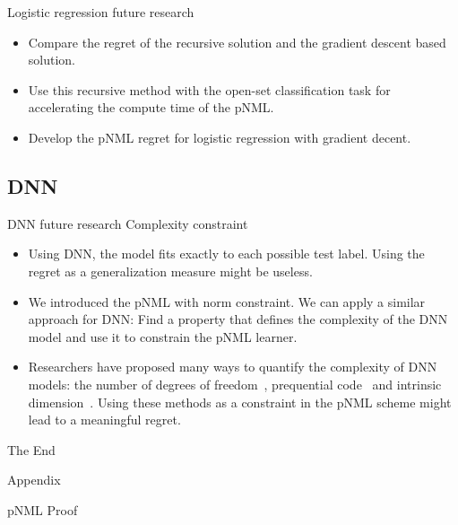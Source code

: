 \documentclass[aspectratio=169]{beamer}
\newcommand{\backupbegin}{
   \newcounter{finalframe}
   \setcounter{finalframe}{\value{framenumber}}
}
\begin{document}
\begin{frame}{Logistic regression future research}
\begin{itemize}
\setlength\itemsep{2em}
    \item Compare the regret of the recursive solution and the gradient descent based solution.
    \item  Use this recursive method with the open-set classification task for accelerating the compute time of the pNML.
    \item Develop the pNML regret for logistic regression with gradient decent.
\end{itemize}
\end{frame}

\subsection{DNN}
\begin{frame}{DNN future research}
Complexity constraint
\begin{itemize}
\item Using DNN, the model fits exactly to each possible test label. 
Using the regret as a generalization measure might be useless.
\item We introduced the pNML with norm constraint. We can apply a similar approach for DNN: Find a property that defines the complexity of the DNN model and use it to constrain the pNML learner.
\item Researchers have proposed many ways to quantify the complexity of DNN models: the number of degrees of freedom~, prequential code~ and intrinsic dimension~.
Using these methods as a constraint in the pNML scheme might lead to a meaningful regret.
\end{itemize}
\end{frame}



\begin{frame}
\Huge{\centerline{The End}}
\end{frame}


\backupbegin
\begin{frame}[c]
\begin{center}
\Huge Appendix
\end{center}
\end{frame}

\begin{frame}{pNML Proof}
    
\end{frame}
\end{document}
